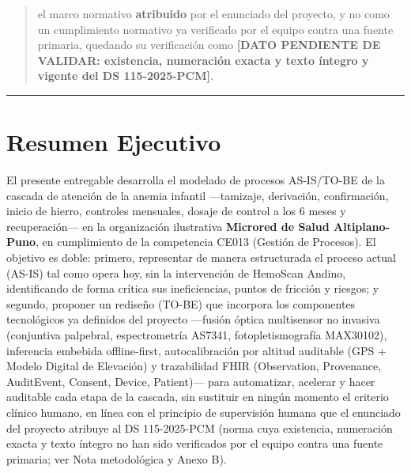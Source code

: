 \documentclass[11pt,a4paper]{article}
\begin{document}
\begin{quote}
el marco normativo \textbf{atribuido} por el enunciado del proyecto, y no como un cumplimiento normativo ya verificado por el equipo contra una fuente primaria, quedando su verificación como \textbf{{[}DATO PENDIENTE DE VALIDAR: existencia, numeración exacta y texto íntegro y vigente del DS 115-2025-PCM{]}}.
\end{quote}

\begin{center}\rule{0.5\linewidth}{0.5pt}\end{center}

\section{Resumen Ejecutivo}\label{resumen-ejecutivo}

El presente entregable desarrolla el modelado de procesos AS-IS/TO-BE de la cascada de atención de la anemia infantil ---tamizaje, derivación, confirmación, inicio de hierro, controles mensuales, dosaje de control a los 6 meses y recuperación--- en la organización ilustrativa \textbf{Microred de Salud Altiplano-Puno}, en cumplimiento de la competencia CE013 (Gestión de Procesos). El objetivo es doble: primero, representar de manera estructurada el proceso actual (AS-IS) tal como opera hoy, sin la intervención de HemoScan Andino, identificando de forma crítica sus ineficiencias, puntos de fricción y riesgos; y segundo, proponer un rediseño (TO-BE) que incorpora los componentes tecnológicos ya definidos del proyecto ---fusión óptica multisensor no invasiva (conjuntiva palpebral, espectrometría AS7341, fotopletismografía MAX30102), inferencia embebida offline-first, autocalibración por altitud auditable (GPS + Modelo Digital de Elevación) y trazabilidad FHIR (Observation, Provenance, AuditEvent, Consent, Device, Patient)--- para automatizar, acelerar y hacer auditable cada etapa de la cascada, sin sustituir en ningún momento el criterio clínico humano, en línea con el principio de supervisión humana que el enunciado del proyecto atribuye al DS 115-2025-PCM (norma cuya existencia, numeración exacta y texto íntegro no han sido verificados por el equipo contra una fuente primaria; ver Nota metodológica y Anexo B).
\end{document}
